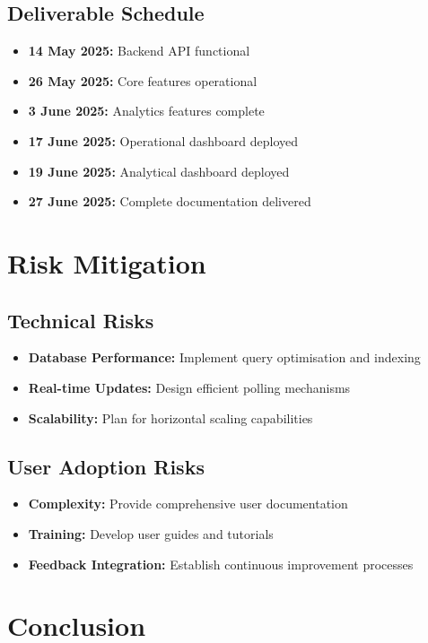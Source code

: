\documentclass[11pt,a4paper]{article}
\begin{document}
\subsection{Deliverable Schedule}
\begin{itemize}
    \item \textbf{14 May 2025:} Backend API functional
    \item \textbf{26 May 2025:} Core features operational
    \item \textbf{3 June 2025:} Analytics features complete
    \item \textbf{17 June 2025:} Operational dashboard deployed
    \item \textbf{19 June 2025:} Analytical dashboard deployed
    \item \textbf{27 June 2025:} Complete documentation delivered
\end{itemize}

\section{Risk Mitigation}

\subsection{Technical Risks}
\begin{itemize}
    \item \textbf{Database Performance:} Implement query optimisation and indexing
    \item \textbf{Real-time Updates:} Design efficient polling mechanisms
    \item \textbf{Scalability:} Plan for horizontal scaling capabilities
\end{itemize}

\subsection{User Adoption Risks}
\begin{itemize}
    \item \textbf{Complexity:} Provide comprehensive user documentation
    \item \textbf{Training:} Develop user guides and tutorials
    \item \textbf{Feedback Integration:} Establish continuous improvement processes
\end{itemize}

\section{Conclusion}
\end{document}
